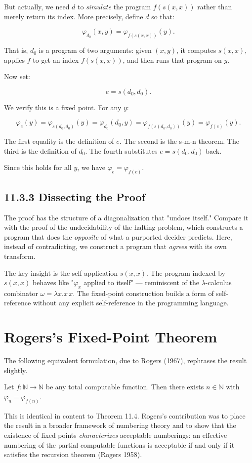 But actually, we need $d$ to \textit{simulate} the program $f(s(x, x))$ rather than merely return its index. More precisely, define $d$ so that:

\[\varphi_{d_0}(x, y) = \varphi_{f(s(x,x))}(y).\]

That is, $d_0$ is a program of two arguments: given $(x, y)$, it computes $s(x, x)$, applies $f$ to get an index $f(s(x, x))$, and then runs that program on $y$.

Now set:

\[e = s(d_0, d_0).\]

We verify this is a fixed point. For any $y$:

\[\varphi_e(y) = \varphi_{s(d_0, d_0)}(y) = \varphi_{d_0}(d_0, y) = \varphi_{f(s(d_0, d_0))}(y) = \varphi_{f(e)}(y).\]

The first equality is the definition of $e$. The second is the s-m-n theorem. The third is the definition of $d_0$. The fourth substitutes $e = s(d_0, d_0)$ back.

Since this holds for all $y$, we have $\varphi_e = \varphi_{f(e)}$. 

\subsection{11.3.3 Dissecting the Proof}

The proof has the structure of a diagonalization that "undoes itself." Compare it with the proof of the undecidability of the halting problem, which constructs a program that does the \textit{opposite} of what a purported decider predicts. Here, instead of contradicting, we construct a program that \textit{agrees} with its own transform.

The key insight is the self-application $s(x, x)$. The program indexed by $s(x, x)$ behaves like "$\varphi_x$ applied to itself" --- reminiscent of the $\lambda$-calculus combinator $\omega = \lambda x. x\, x$. The fixed-point construction builds a form of self-reference without any explicit self-reference in the programming language.

\section{Rogers's Fixed-Point Theorem}

The following equivalent formulation, due to Rogers (1967), rephrases the result slightly.

\begin{theorem}
Let $f: \mathbb{N} \to \mathbb{N}$ be any total computable function. Then there exists $n \in \mathbb{N}$ with $\varphi_n = \varphi_{f(n)}$.

This is identical in content to Theorem 11.4. Rogers's contribution was to place the result in a broader framework of numbering theory and to show that the existence of fixed points \textit{characterizes} acceptable numberings: an effective numbering of the partial computable functions is acceptable if and only if it satisfies the recursion theorem (Rogers 1958).
\end{theorem}

